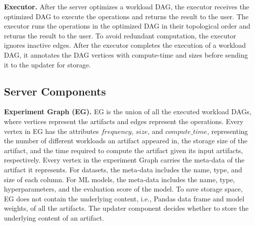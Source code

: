 \textbf{Executor. }
After the server optimizes a workload DAG, the executor receives the optimized DAG to execute the operations and returns the result to the user.
The executor runs the operations in the optimized DAG in their topological order and returns the result to the user.
To avoid redundant computation, the executor ignores inactive edges.
After the executor completes the execution of a workload DAG, it annotates the DAG vertices with compute-time and sizes before sending it to the updater for storage.

%

\subsection{Server Components}
\textbf{Experiment Graph (EG).}
EG is the union of all the executed workload DAGs, where vertices represent the artifacts and edges represent the operations.
Every vertex in EG has the attributes $frequency$, $size$, and $compute\_time$, representing the number of different workloads an artifact appeared in, the storage size of the artifact, and the time required to compute the artifact given its input artifacts, respectively.
Every vertex in the experiment Graph carries the meta-data of the artifact it represents.
For datasets, the meta-data includes the name, type, and size of each column.
For ML models, the meta-data includes the name, type, hyperparameters, and the evaluation score of the model.
To save storage space, EG does not contain the underlying content, i.e., Pandas data frame and model weights, of all the artifacts.
The updater component decides whether to store the underlying content of an artifact.

